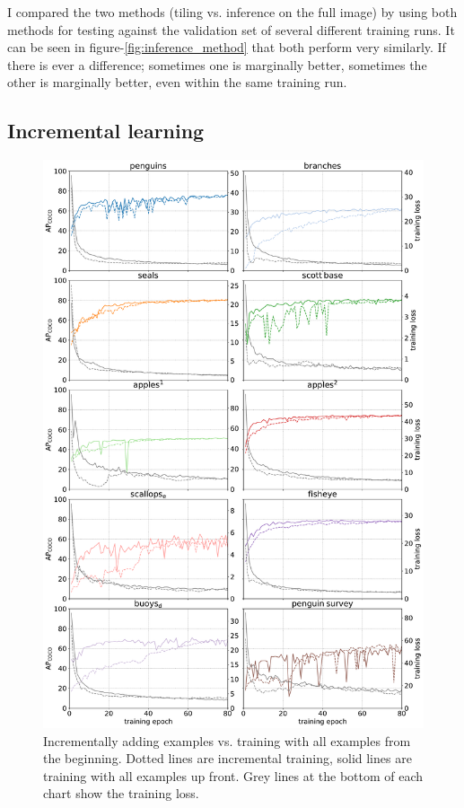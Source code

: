 I compared the two methods (tiling vs. inference on the full image) by using both methods for testing against the validation set of several different training runs. It can be seen in figure-\ref{fig:inference_method} that both perform very similarly. If there is ever a difference; sometimes one is marginally better, sometimes the other is marginally better, even within the same training run.

\subsection{Incremental learning}
\label{sec:incremental_learning}

\begin{figure}[H]
  \centering
  \includegraphics[width=0.9\linewidth]{charts/training/incremental.pdf}
  \caption{Incrementally adding examples vs. training with all examples from the beginning. Dotted lines are incremental training, solid lines are training with all examples up front. Grey lines at the bottom of each chart show the training loss.}  
  \label{fig:incremental}
\end{figure}


